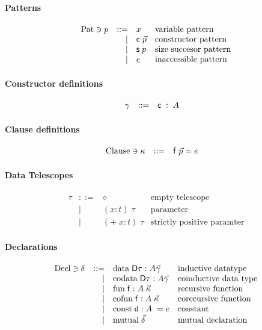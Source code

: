 \paragraph*{Patterns}
\[
\begin{array}{lrll}
\mathrm{Pat} \ni p & ::= & x & \mbox{variable pattern}\\
& \mid & \mathsf{c} \; \vec{p} & \mbox{constructor pattern}\\
& \mid & \mathsf{s}\; p & \mbox{size succesor pattern}\\
& \mid & \underline{e} & \mbox{inaccessible pattern}\\
\end{array}
\]

\paragraph*{Constructor definitions}
\[
\begin{array}{lrll}
\gamma &  ::= & \mathsf{c} \; : \; A & 
\end{array}
\]

\paragraph*{Clause definitions}
\[
\begin{array}{lrll}
\mathrm{Clause} \ni \kappa & ::= & \mathsf{f} \; \vec{p} = e & 
\end{array}
\]

\paragraph*{Data Telescopes}
\[
\begin{array}{lrll}
\tau & ::= & \diamond & \mbox{empty telescope}\\
& \mid & ( x : t ) \; \tau & \mbox{parameter}\\
& \mid & ( + \; x : t ) \; \tau & \mbox{strictly positive paramter}
\end{array}
\]

\paragraph*{Declarations}
\[
\begin{array}{lrll}
\mathrm{Decl} \ni \delta & ::= & \mathrm{data}\; \mathsf{D} \tau : A \vec{\gamma} & \mbox{inductive datatype}\\ 
& \mid & \mathrm{codata}\; \mathsf{D} \tau : A \vec{\gamma} & \mbox{coinductive data type} \\
& \mid & \mathrm{fun}\; \mathsf{f} : A \; \vec{\kappa} & \mbox{recursive function}\\
& \mid & \mathrm{cofun}\; \mathsf{f} : A \; \vec{\kappa} & \mbox{corecursive function}\\ 
& \mid & \mathrm{const}\; \mathsf{d} : A \; = e & \mbox{constant}\\
& \mid & \mathrm{mutual}\; \vec{\delta} & \mbox{mutual declaration}
\end{array}
\]




